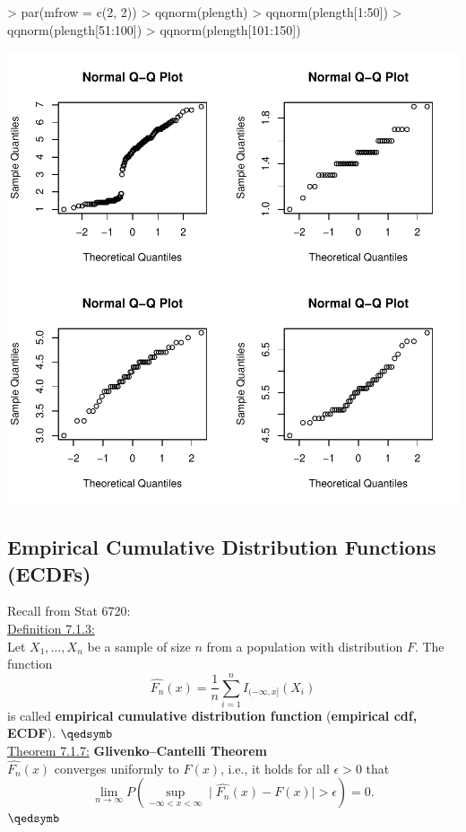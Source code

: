 \begin{Schunk}
\begin{Sinput}
> par(mfrow = c(2, 2))
> qqnorm(plength)
> qqnorm(plength[1:50])
> qqnorm(plength[51:100])
> qqnorm(plength[101:150])
\end{Sinput}
\end{Schunk}
\includegraphics{lect_chapter5_v2-034}


\newpage


\subsection{Empirical Cumulative Distribution Functions (ECDFs)}


Recall from Stat 6720: \\

\underline{Definition 7.1.3:} \\
Let $X_1, \ldots, X_n$ be a sample of size $n$ from a population with
distribution $F$. The function
\[
\hat{F_n} (x) = \frac{1}{n} \displaystyle\sum_{i=1}^n
  I_{(-\infty, x]} (X_i)
\]
is called 
{\bf empirical cumulative distribution function} 
({\bf empirical cdf, ECDF}).
$\qedsymb$ \\


\underline{Theorem 7.1.7:}
{\bf Glivenko--Cantelli Theorem} \\
%
$\hat{F_n} (x)$ converges uniformly to $F(x)$, i.e., it holds
for all $\epsilon > 0$ that
\[
\displaystyle\lim_{n \rightarrow \infty}
  P(\sup_{-\infty < x < \infty} \mid \hat{F_n} (x) - F(x) \mid >
   \epsilon) = 0.
\]
$\qedsymb$


